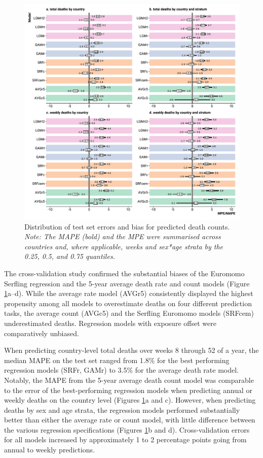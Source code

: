 \documentclass[12pt]{article}
\begin{document}
\begin{figure}
\caption{Distribution of test set errors and bias for predicted death counts. \emph{Note: The MAPE (bold) and the MPE were summarised across countries and, where applicable, weeks and sex*age strata by the 0.25, 0.5, and 0.75 quantiles.}}
\label{fig:biaserror}
\includegraphics{errorbias.pdf}
\end{figure}

The cross-validation study confirmed the substantial biases of the Euromomo Serfling regression and the 5-year average death rate and count models (Figure \ref{fig:biaserror}a--d). While the average rate model (AVGr5) consistently displayed the highest propensity among all models to overestimate deaths on four different prediction tasks, the average count (AVGc5) and the Serfling Euromomo models (SRFcem) underestimated deaths. Regression models with exposure offset were comparatively unbiased.

When predicting country-level total deaths over weeks 8 through 52 of a year, the median MAPE on the test set ranged from 1.8\% for the best performing regression models (SRFr, GAMr) to 3.5\% for the average death rate model. Notably, the MAPE from the 5-year average death count model was comparable to the error of the best-performing regression models when predicting annual or weekly deaths on the country level (Figures \ref{fig:biaserror}a and c). However, when predicting deaths by sex and age strata, the regression models performed substantially better than either the average rate or count model, with little difference between the various regression specifications (Figures \ref{fig:biaserror}b and d). Cross-validation errors for all models increased by approximately 1 to 2 percentage points going from annual to weekly predictions.
\end{document}
